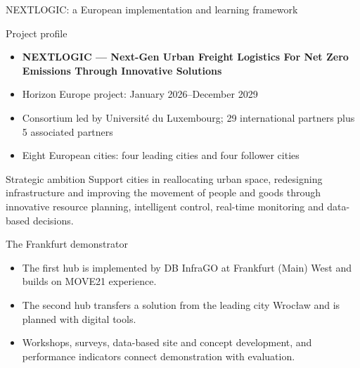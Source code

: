 \documentclass[aspectratio=169,11pt]{beamer}
\newcommand{\source}[1]{\par\vspace{2pt}{\tiny\textcolor{gray}{Source: #1}}}
\begin{document}
\begin{frame}{NEXTLOGIC: a European implementation and learning framework}
\begin{block}{Project profile}
\begin{itemize}
  \item \textbf{NEXTLOGIC — Next-Gen Urban Freight Logistics For Net Zero Emissions Through Innovative Solutions}
  \item Horizon Europe project: January 2026--December 2029
  \item Consortium led by Université du Luxembourg; 29 international partners plus 5 associated partners
  \item Eight European cities: four leading cities and four follower cities
\end{itemize}
\end{block}
\begin{block}{Strategic ambition}
Support cities in reallocating urban space, redesigning infrastructure and improving the movement of people and goods through innovative resource planning, intelligent control, real-time monitoring and data-based decisions.
\end{block}
\source{HOLM, “HORIZON-Projekt NEXTLOGIC in Frankfurt am Main” (accessed November 2026).}
\end{frame}

\begin{frame}{The Frankfurt demonstrator}
\vspace{3mm}
\begin{itemize}
  \item The first hub is implemented by DB InfraGO at Frankfurt (Main) West and builds on MOVE21 experience.
  \item The second hub transfers a solution from the leading city Wrocław and is planned with digital tools.
  \item Workshops, surveys, data-based site and concept development, and performance indicators connect demonstration with evaluation.
\end{itemize}
\source{HOLM, “HORIZON-Projekt NEXTLOGIC in Frankfurt am Main”.}
\end{frame}
\end{document}
